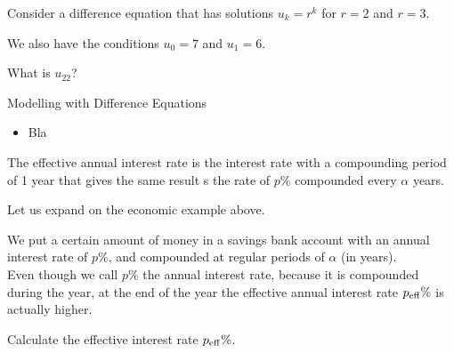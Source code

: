 \bookonlynewpage


\question
	Consider a difference equation that has solutions $u_k = r^k$ for $r=2$ and $r=3$.
	
	We also have the conditions $u_0 = 7$ and $u_1=6$.
	
	What is $u_{22}$?



\standardonlynewpage

%
%



\begin{module}{Modelling with Difference Equations}
	\label{diff:model}

	
	
\end{module}



\begin{lesson}

	\begin{itemize}
		\item Bla
	\end{itemize}
	

\end{lesson}



\begin{annotation}
\begin{goals}
	The effective annual interest rate is the interest rate with a compounding period of 1 year that gives the same result s the rate of $p\%$ compounded every $\alpha$ years.
\end{goals}
\end{annotation}
\question
	Let us expand on the economic example above.
	
	We put a certain amount of money in a savings bank account with an annual interest rate of $p\%$, and compounded at regular periods of $\alpha$ (in years). \\
	
	Even though we call $p\%$ the annual interest rate, because it is compounded during the year, at the end of the year the effective annual interest rate $p_{\rm eff}\%$ is actually higher.
	
	Calculate the effective interest rate $p_{\rm eff}\%$.


